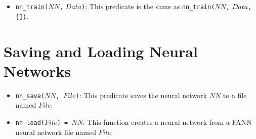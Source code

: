 \begin{itemize}
\begin{itemize}
\item \texttt{sp\_thresh($X$)}: $X$ is the \texttt{sarprop} step error threshold factor.
\item \texttt{sp\_shift($X$)}: $X$ is the \texttt{sarprop} step error shift.
\item \texttt{sp\_temp($X$)}: $X$ is the \texttt{sarprop} temperature.
\item \texttt{scale($InMin$, $InMax$, $OutMin$, $OutMax$)}: use training data scaling.
\item \texttt{inscale($InMin$, $InMax$)}:  use input data scaling.
\item \texttt{outscale($OutMin$, $OutMax$)}: use output data scaling.
\end{itemize}

\item \texttt{nn\_train($NN$,} \texttt{$Data$)}: This predicate is the same as \texttt{nn\_train($NN$,} \texttt{$Data$, [])}.
\end{itemize}

\section{Saving and Loading Neural Networks}
\begin{itemize}
\item \texttt{nn\_save($NN$, $File$)}: This predicate saves the neural network $NN$ to a file named $File$.

\item \texttt{nn\_load($File$) = $NN$}: This function creates a neural network from a FANN neural network file named $File$.
\end{itemize}

